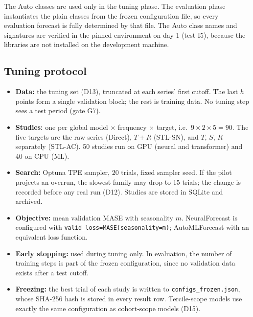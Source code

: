 \documentclass[11pt,a4paper]{article}
\newcommand{\code}[1]{\texttt{#1}}
\begin{document}
The Auto classes are used only in the tuning phase. The evaluation phase instantiates the plain
classes from the frozen configuration file, so every evaluation forecast is fully determined by that
file. The Auto class names and signatures are verified in the pinned environment on day 1 (test I5),
because the libraries are not installed on the development machine.

\subsection{Tuning protocol}\label{sec:tuning}

\begin{itemize}
  \item \textbf{Data:} the tuning set (D13), truncated at each series' first cutoff. The last $h$
  points form a single validation block; the rest is training data. No tuning step sees a test
  period (gate G7).
  \item \textbf{Studies:} one per global model $\times$ frequency $\times$ target, i.e.\
  $9 \times 2 \times 5 = 90$. The five targets are the raw series (Direct), $T+R$ (STL-SN), and $T$,
  $S$, $R$ separately (STL-AC). 50 studies run on GPU (neural and transformer) and 40 on CPU (ML).
  \item \textbf{Search:} Optuna TPE sampler, 20 trials, fixed sampler seed. If the pilot projects
  an overrun, the slowest family may drop to 15 trials; the change is recorded before any real run
  (D12). Studies are stored in SQLite and archived.
  \item \textbf{Objective:} mean validation MASE with seasonality $m$. NeuralForecast is configured
  with \code{valid_loss=MASE(seasonality=m)}; AutoMLForecast with an equivalent loss function.
  \item \textbf{Early stopping:} used during tuning only. In evaluation, the number of training steps
  is part of the frozen configuration, since no validation data exists after a test cutoff.
  \item \textbf{Freezing:} the best trial of each study is written to \code{configs_frozen.json},
  whose SHA-256 hash is stored in every result row. Tercile-scope models use exactly the same
  configuration as cohort-scope models (D15).
\end{itemize}
\end{document}
